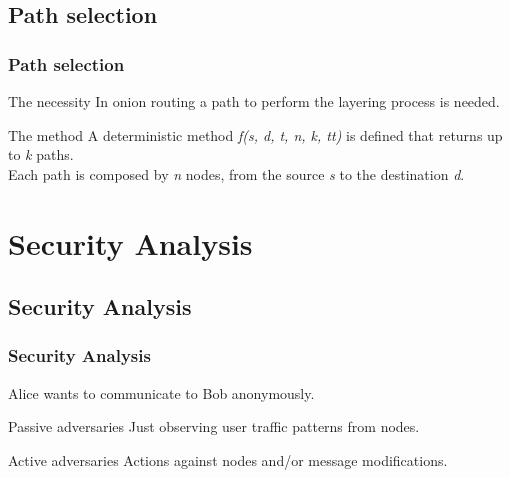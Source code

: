 \documentclass[compress,red]{beamer}
\begin{document}
\subsection{Path selection}
\begin{frame}
\frametitle{Path selection}
\begin{block}{The necessity}
In onion routing a path to perform the layering process is needed.
\end{block}
\bigskip
\begin{block}{}

\end{block}
\bigskip
\begin{block}{The method}
A deterministic method \textit{f(s, d, t, n, k, tt)} is defined that returns up to \textit{k} paths. \\
Each path is composed by \textit{n} nodes, from the source \textit{s} to the destination \textit{d}.
\end{block}
\end{frame} %

\section{Security Analysis}
\subsection{Security Analysis}
\begin{frame}
\frametitle{Security Analysis}
Alice wants to communicate to Bob anonymously.
\bigskip
\begin{block}{Passive adversaries}
Just observing user traffic patterns from nodes.
\end{block}
\bigskip
\begin{block}{Active adversaries}
Actions against nodes and/or message modifications.
\end{block}
\end{frame}
\end{document}
